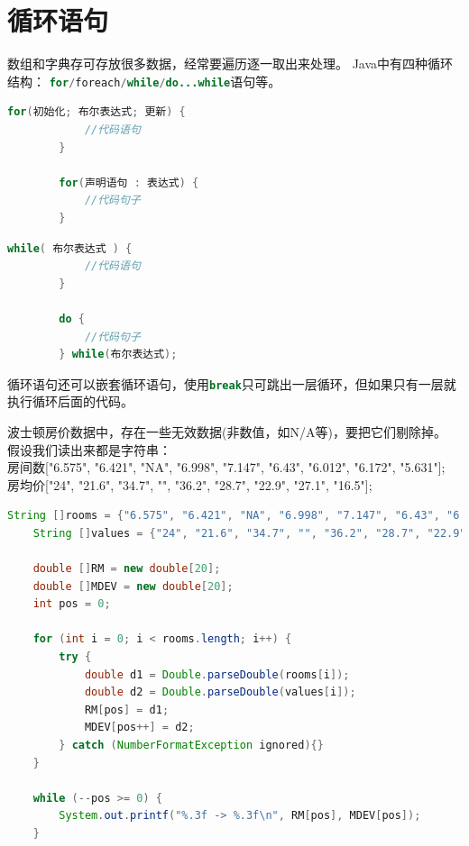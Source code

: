 \section{循环语句}
	数组和字典存可存放很多数据，经常要遍历逐一取出来处理。
	Java中有四种循环结构：
	\lstinline[language=Java]{for/foreach/while/do...while}语句等。

	\begin{minipage}[t]{0.45\textwidth}
	\begin{lstlisting}[language=Java]
		for(初始化; 布尔表达式; 更新) {
			//代码语句
		}

		for(声明语句 : 表达式) {
			//代码句子
		}
	\end{lstlisting}
	\end{minipage}
	\begin{minipage}[t]{0.4\textwidth}
	\begin{lstlisting}[language=Java]
		while( 布尔表达式 ) {  
			//代码语句
		}

		do {
			//代码句子
		} while(布尔表达式);
	\end{lstlisting}
	\end{minipage}
	
	\noindent
	循环语句还可以嵌套循环语句，使用\lstinline[language=Java]{break}只可跳出一层循环，但如果只有一层就执行循环后面的代码。
	\bigskip

	\begin{example}
		波士顿房价数据中，存在一些无效数据(非数值，如N/A等)，要把它们剔除掉。
		假设我们读出来都是字符串：\\
		房间数["6.575", "6.421", "NA", "6.998", "7.147", "6.43", "6.012", "6.172", "5.631"];\\
		房均价["24", "21.6", "34.7", "", "36.2", "28.7", "22.9", "27.1", "16.5"];
	\end{example}

\begin{lstlisting}[language=Java]
	String []rooms = {"6.575", "6.421", "NA", "6.998", "7.147", "6.43", "6.012", "6.172", "5.631"};
	String []values = {"24", "21.6", "34.7", "", "36.2", "28.7", "22.9", "27.1", "16.5"};

	double []RM = new double[20];
	double []MDEV = new double[20];
	int pos = 0;

	for (int i = 0; i < rooms.length; i++) {
		try {
			double d1 = Double.parseDouble(rooms[i]);
			double d2 = Double.parseDouble(values[i]);
			RM[pos] = d1;
			MDEV[pos++] = d2;
		} catch (NumberFormatException ignored){}
	}

	while (--pos >= 0) {
		System.out.printf("%.3f -> %.3f\n", RM[pos], MDEV[pos]);
	}
\end{lstlisting}

